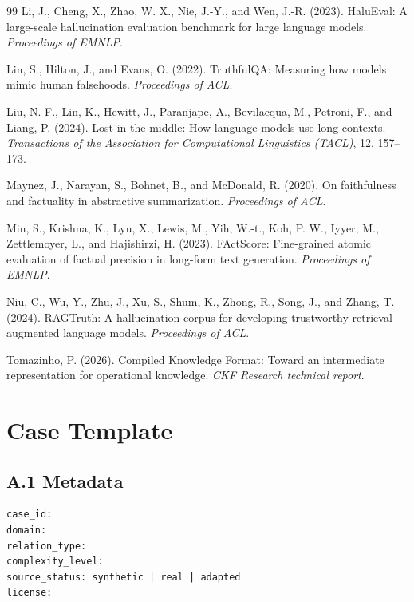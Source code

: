\documentclass[11pt]{article}
\begin{document}
\begin{thebibliography}{99}
Li, J., Cheng, X., Zhao, W. X., Nie, J.-Y., and Wen, J.-R. (2023).
HaluEval: A large-scale hallucination evaluation benchmark for large language models.
\emph{Proceedings of EMNLP}.

Lin, S., Hilton, J., and Evans, O. (2022).
TruthfulQA: Measuring how models mimic human falsehoods.
\emph{Proceedings of ACL}.

Liu, N. F., Lin, K., Hewitt, J., Paranjape, A., Bevilacqua, M., Petroni, F., and Liang, P. (2024).
Lost in the middle: How language models use long contexts.
\emph{Transactions of the Association for Computational Linguistics (TACL)}, 12, 157--173.

Maynez, J., Narayan, S., Bohnet, B., and McDonald, R. (2020).
On faithfulness and factuality in abstractive summarization.
\emph{Proceedings of ACL}.

Min, S., Krishna, K., Lyu, X., Lewis, M., Yih, W.-t., Koh, P. W., Iyyer, M., Zettlemoyer, L., and Hajishirzi, H. (2023).
FActScore: Fine-grained atomic evaluation of factual precision in long-form text generation.
\emph{Proceedings of EMNLP}.

Niu, C., Wu, Y., Zhu, J., Xu, S., Shum, K., Zhong, R., Song, J., and Zhang, T. (2024).
RAGTruth: A hallucination corpus for developing trustworthy retrieval-augmented language models.
\emph{Proceedings of ACL}.

Tomazinho, P. (2026).
Compiled Knowledge Format: Toward an intermediate representation for operational knowledge.
\emph{CKF Research technical report}.

\end{thebibliography}

\appendix

\section{Case Template}

\subsection*{A.1 Metadata}

\begin{verbatim}
case_id:
domain:
relation_type:
complexity_level:
source_status: synthetic | real | adapted
license:
\end{verbatim}
\end{document}
